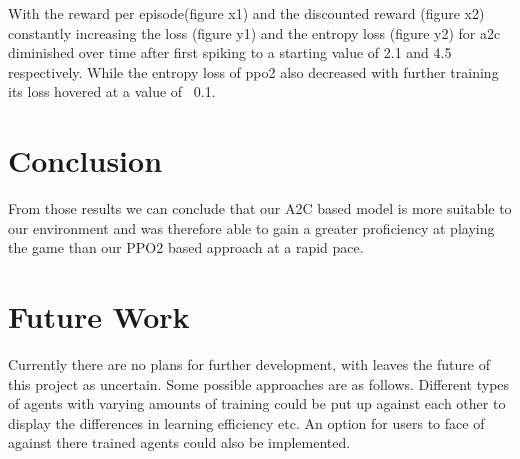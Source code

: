\documentclass[sigconf]{acmart}
\begin{document}
With the reward per episode(figure x1) and the discounted reward (figure x2) constantly increasing the loss (figure y1) and the entropy loss (figure y2) for a2c diminished over time after first spiking to a starting value of 2.1 and 4.5 respectively. While the entropy loss of ppo2 also decreased with further training its loss hovered at a value of ~0.1.

\vfill
\pagebreak
\section{Conclusion}
From those results we can conclude that our A2C based model is more suitable to our environment and was therefore able to gain a greater proficiency at playing the game than our PPO2 based approach at a rapid pace. 
   
\section{Future Work}
Currently there are no plans for further development, with leaves the future of  this project as uncertain. Some possible approaches are as follows. 
Different types of agents with varying amounts of training could be put up against each other to display the differences in learning efficiency etc. An option for users to face of against there trained agents could also be implemented.
\vfill
\pagebreak


\end{document}
